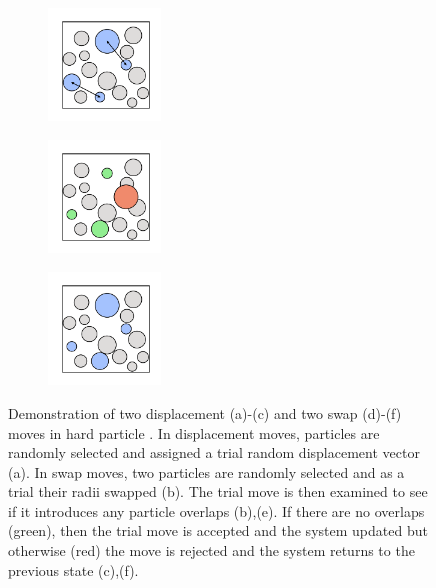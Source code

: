 \begin{figure}[bt]
     	\vspace{0.5cm}
       \begin{subfigure}[b]{0.25\textwidth}
         \centering
         \includegraphics[width=3cm]{./figures/methods/mc_move_d.pdf}
         \caption{}
         \label{fig:hardmc4}
     \end{subfigure}
     \begin{subfigure}[b]{0.25\textwidth}
         \centering
         \includegraphics[width=3cm]{./figures/methods/mc_move_e.pdf}
         \caption{}
         \label{fig:hardmc5}
     \end{subfigure}
     \begin{subfigure}[b]{0.25\textwidth}
         \centering
         \includegraphics[width=3cm]{./figures/methods/mc_move_f.pdf}
         \caption{}
         \label{fig:hardmc6}
     \end{subfigure}
   
     \caption{Demonstration of two displacement (a)\--(c) and two swap (d)\--(f) moves in hard particle \mc.
     In displacement moves, particles are randomly selected and assigned a trial random displacement vector (a). In swap moves, two particles are randomly selected and as a trial their radii swapped (b). The trial move is then examined to see if it introduces any particle overlaps (b),(e). If there are no overlaps (green), then the trial move is accepted and the system updated but otherwise (red) the move is rejected and the system returns to the previous state (c),(f).
     }
     \label{fig:hardmc}
     

\end{figure}
